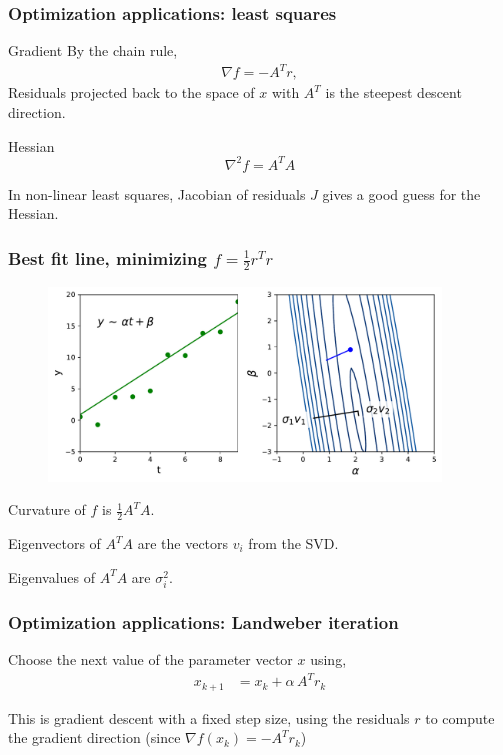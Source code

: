 \documentclass[xcolor={dvipsnames}]{beamer}
\begin{document}
\begin{frame}
\frametitle{Optimization applications: least squares}
\begin{exampleblock}{Gradient}
By the chain rule,
\begin{align*}
 \nabla f = - A^T r,
\end{align*}
Residuals projected back to the space of $x$ with $A^T$ is the steepest descent direction.
\end{exampleblock}
\begin{exampleblock}{Hessian}
$$\nabla^2 f = A^T A $$

In non-linear least squares, Jacobian of residuals $J$ gives a good guess for the Hessian.
\end{exampleblock}
\end{frame}

\begin{frame}
\frametitle{Best fit line, minimizing $f = \frac{1}{2} r^T r$}
\begin{figure}
\includegraphics[width=0.93\textwidth]{figs/linear_fit.pdf}
\end{figure}
\begin{block}{}
Curvature of $f$ is $\frac{1}{2}A^T A$.

Eigenvectors of $A^T A$ are the vectors $v_i$ from the SVD.

Eigenvalues of $A^T A$ are $\sigma_i^2$.
\end{block}
\end{frame}

\begin{frame}
\frametitle{Optimization applications: Landweber iteration}
Choose the next value of the parameter vector $x$ using,
\begin{align*}
x_{k+1}& = x_k + \alpha \, A^T r_k 
\end{align*}
\begin{block}{}
This is gradient descent with a fixed step size, using the residuals $r$ to compute the gradient direction (since $\nabla f(x_k) = - A^T r_k$)
\end{block}
\end{frame}
\end{document}

